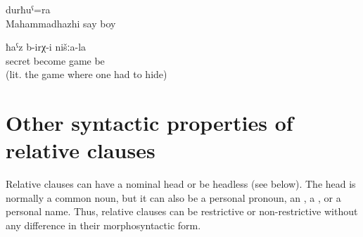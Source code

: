 \begin{exe}
	\ex	\label{ex:the boy called Mahammadhazhi}
	\gll	[Maħaˁmmadħaˁži	b-ik'ʷ-an]	durħuˁ=ra\\
		Mahammadhazhi	say	boy\\
	\glt	{}

	\ex	\label{ex:There was this game of ours, the hide-and-seek}
		ħaˁz	b-irχ-i	nišːa-la\\
		secret	become	game	be	\\
	\glt	{} (lit. the game where one had to hide)
\end{exe}



\section{Other syntactic properties of relative clauses}
\label{sec:Other syntactic properties of relative clauses}

Relative clauses can have a nominal head or be headless (see  below). The head is normally a common noun, but it can also be a personal pronoun, an , a , or a personal name. Thus, relative clauses can be restrictive or non-restrictive without any difference in their morphosyntactic form.


